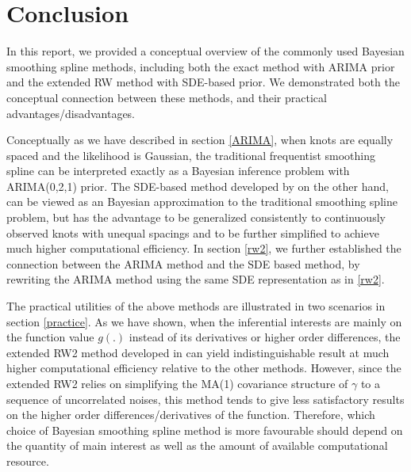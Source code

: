 \documentclass{article}
\begin{document}
\section{Conclusion}\label{conclusion}

In this report, we provided a conceptual overview of the commonly used Bayesian smoothing spline methods, including both the exact method with ARIMA prior and the extended RW method with SDE-based prior. We demonstrated both the conceptual connection between these methods, and their practical advantages/disadvantages. 

Conceptually as we have described in section \ref{ARIMA}, when knots are equally spaced and the likelihood is Gaussian, the traditional frequentist smoothing spline can be interpreted exactly as a Bayesian inference problem with ARIMA(0,2,1) prior. The SDE-based method developed by \cite{rw2} on the other hand, can be viewed as an Bayesian approximation to the traditional smoothing spline problem, but has the advantage to be generalized consistently to continuously observed knots with unequal spacings and to be further simplified to achieve much higher computational efficiency. In section \ref{rw2}, we further established the connection between the ARIMA method and the SDE based method, by rewriting the ARIMA method using the same SDE representation as in \ref{rw2}.

The practical utilities of the above methods are illustrated in two scenarios in section \ref{practice}. As we have shown, when the inferential interests are mainly on the function value $g(.)$ instead of its derivatives or higher order differences, the extended RW2 method developed in \cite{rw2} can yield indistinguishable result at much higher computational efficiency relative to the other methods. However, since the extended RW2 relies on simplifying the MA(1) covariance structure of $\gamma$ to a sequence of uncorrelated noises, this method tends to give less satisfactory results on the higher order differences/derivatives of the function. Therefore, which choice of Bayesian smoothing spline method is more favourable should depend on the quantity of main interest as well as the amount of available computational resource.






\newpage


\end{document}
